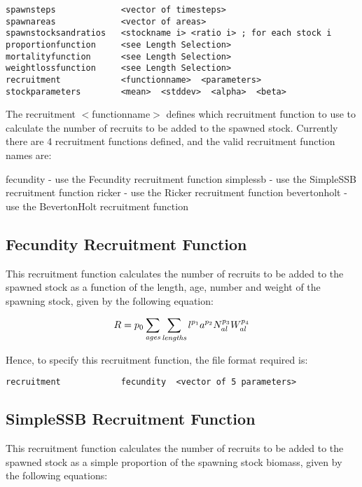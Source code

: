 \documentclass [a4paper, 10pt]{book}
\begin{document}
{\small\begin{verbatim}
spawnsteps             <vector of timesteps>
spawnareas             <vector of areas>
spawnstocksandratios   <stockname i> <ratio i> ; for each stock i
proportionfunction     <see Length Selection>
mortalityfunction      <see Length Selection>
weightlossfunction     <see Length Selection>
recruitment            <functionname>  <parameters>
stockparameters        <mean>  <stddev>  <alpha>  <beta>
\end{verbatim}}

The recruitment $<$functionname$>$ defines which recruitment function to use to calculate the number of recruits to be added to the spawned stock.  Currently there are 4 recruitment functions defined, and the valid recruitment function names are:

\bigskip
fecundity - use the Fecundity recruitment function\newline
simplessb - use the SimpleSSB recruitment function\newline
ricker - use the Ricker recruitment function\newline
bevertonholt - use the BevertonHolt recruitment function

\subsection{Fecundity Recruitment Function}
This recruitment function calculates the number of recruits to be added to the spawned stock as a function of the length, age, number and weight of the spawning stock, given by the following equation:

\begin{equation}\label{eq:rec1}
R = p_{0} \sum_{\it ages}\sum_{\it lengths} l ^{p_{1}} a ^{p_{2}} N_{al} ^{p_{3}} W_{al} ^{p_{4}}
\end{equation}

Hence, to specify this recruitment function, the file format required is:

{\small\begin{verbatim}
recruitment            fecundity  <vector of 5 parameters>
\end{verbatim}}

\subsection{SimpleSSB Recruitment Function}
This recruitment function calculates the number of recruits to be added to the spawned stock as a simple proportion of the spawning stock biomass, given by the following equations:
\end{document}
